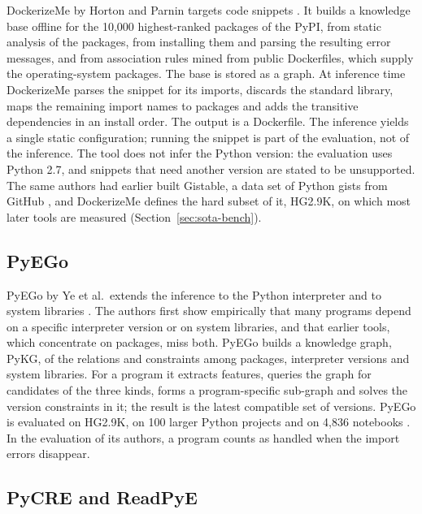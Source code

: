 DockerizeMe by Horton and Parnin targets code snippets \cite{horton2019dockerizeme}. It builds a knowledge base offline for the 10{,}000 highest-ranked packages of the \ac{PyPI}, from static analysis of the packages, from installing them and parsing the resulting error messages, and from association rules mined from public Dockerfiles, which supply the operating-system packages. The base is stored as a graph. At inference time DockerizeMe parses the snippet for its imports, discards the standard library, maps the remaining import names to packages and adds the transitive dependencies in an install order. The output is a Dockerfile. The inference yields a single static configuration; running the snippet is part of the evaluation, not of the inference. The tool does not infer the Python version: the evaluation uses Python 2.7, and snippets that need another version are stated to be unsupported. The same authors had earlier built Gistable, a data set of Python gists from GitHub \cite{horton2018gistable}, and DockerizeMe defines the hard subset of it, HG2.9K, on which most later tools are measured (Section~\ref{sec:sota-bench}).%

\subsection{PyEGo}

PyEGo by Ye et al.\ extends the inference to the Python interpreter and to system libraries \cite{ye2022pyego}. The authors first show empirically that many programs depend on a specific interpreter version or on system libraries, and that earlier tools, which concentrate on packages, miss both. PyEGo builds a knowledge graph, PyKG, of the relations and constraints among packages, interpreter versions and system libraries. For a program it extracts features, queries the graph for candidates of the three kinds, forms a program-specific sub-graph and solves the version constraints in it; the result is the latest compatible set of versions. PyEGo is evaluated on HG2.9K, on 100 larger Python projects and on 4{,}836 notebooks \cite{ye2022pyego}. In the evaluation of its authors, a program counts as handled when the import errors disappear.

\subsection{PyCRE and ReadPyE}

